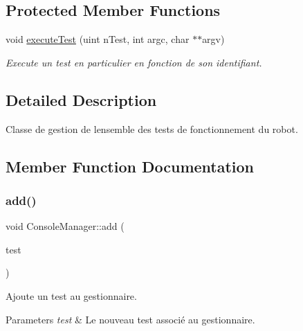 \subsection*{Protected Member Functions}
\begin{DoxyCompactItemize}
\item 
void \hyperlink{classConsoleManager_a417ef6797adc469a5e5a609519a0f75e}{execute\+Test} (uint n\+Test, int argc, char $\ast$$\ast$argv)
\begin{DoxyCompactList}\small\item\em Execute un test en particulier en fonction de son identifiant. \end{DoxyCompactList}\end{DoxyCompactItemize}


\subsection{Detailed Description}
Classe de gestion de l\textquotesingle{}ensemble des tests de fonctionnement du robot. 

\subsection{Member Function Documentation}
\mbox{\label{classConsoleManager_aff7b3a0f19d93f25629cae84791a7084}} 
\subsubsection{\texorpdfstring{add()}{add()}}
{\footnotesize\ttfamily void Console\+Manager\+::add (\begin{DoxyParamCaption}\item[{\hyperlink{classFunctionalTest}{Functional\+Test} $\ast$}]{test }\end{DoxyParamCaption})}



Ajoute un test au gestionnaire. 


\begin{DoxyParams}{Parameters}
{\em test} & Le nouveau test associé au gestionnaire. \\
\hline
\end{DoxyParams}
\mbox{\label{classConsoleManager_a417ef6797adc469a5e5a609519a0f75e}} 
